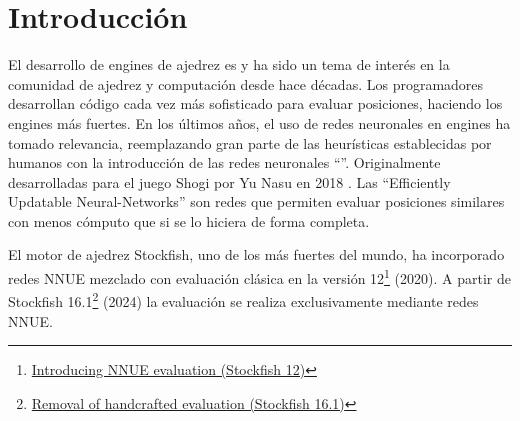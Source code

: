 \section*{Introducción}

El desarrollo de engines de ajedrez es y ha sido un tema de interés en la comunidad de ajedrez y computación desde hace décadas. Los programadores desarrollan código cada vez más sofisticado para evaluar posiciones, haciendo los engines más fuertes. En los últimos años, el uso de redes neuronales en engines ha tomado relevancia, reemplazando gran parte de las heurísticas establecidas por humanos con la introducción de las redes neuronales ``''. Originalmente desarrolladas para el juego Shogi por Yu Nasu en 2018 \cite{nnue:2018}. Las ``Efficiently Updatable Neural-Networks'' son redes que permiten evaluar posiciones similares con menos cómputo que si se lo hiciera de forma completa.

El motor de ajedrez Stockfish, uno de los más fuertes del mundo, ha incorporado redes NNUE mezclado con evaluación clásica en la versión 12\footnote[1]{\href{https://stockfishchess.org/blog/2020/introducing-nnue-evaluation/}{Introducing NNUE evaluation (Stockfish 12)}} (2020). A partir de Stockfish 16.1\footnote[2]{\href{https://stockfishchess.org/blog/2024/stockfish-16-1/}{Removal of handcrafted evaluation (Stockfish 16.1)}} (2024) la evaluación se realiza exclusivamente mediante redes NNUE.
